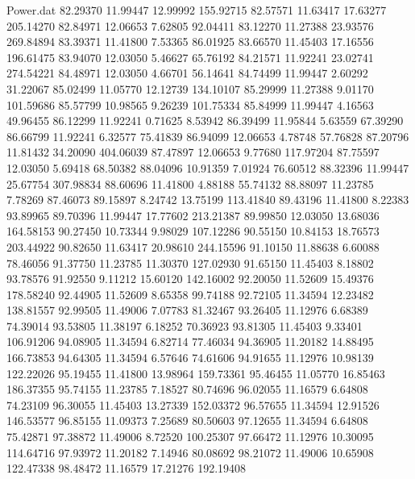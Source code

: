 \begin{filecontents}{Power.dat}
  82.29370   11.99447   12.99992  155.92715
  82.57571   11.63417   17.63277  205.14270
  82.84971   12.06653    7.62805   92.04411
  83.12270   11.27388   23.93576  269.84894
  83.39371   11.41800    7.53365   86.01925
  83.66570   11.45403   17.16556  196.61475
  83.94070   12.03050    5.46627   65.76192
  84.21571   11.92241   23.02741  274.54221
  84.48971   12.03050    4.66701   56.14641
  84.74499   11.99447    2.60292   31.22067
  85.02499   11.05770   12.12739  134.10107
  85.29999   11.27388    9.01170  101.59686
  85.57799   10.98565    9.26239  101.75334
  85.84999   11.99447    4.16563   49.96455
  86.12299   11.92241    0.71625    8.53942
  86.39499   11.95844    5.63559   67.39290
  86.66799   11.92241    6.32577   75.41839
  86.94099   12.06653    4.78748   57.76828
  87.20796   11.81432   34.20090  404.06039
  87.47897   12.06653    9.77680  117.97204
  87.75597   12.03050    5.69418   68.50382
  88.04096   10.91359    7.01924   76.60512
  88.32396   11.99447   25.67754  307.98834
  88.60696   11.41800    4.88188   55.74132
  88.88097   11.23785    7.78269   87.46073
  89.15897    8.24742   13.75199  113.41840
  89.43196   11.41800    8.22383   93.89965
  89.70396   11.99447   17.77602  213.21387
  89.99850   12.03050   13.68036  164.58153
  90.27450   10.73344    9.98029  107.12286
  90.55150   10.84153   18.76573  203.44922
  90.82650   11.63417   20.98610  244.15596
  91.10150   11.88638    6.60088   78.46056
  91.37750   11.23785   11.30370  127.02930
  91.65150   11.45403    8.18802   93.78576
  91.92550    9.11212   15.60120  142.16002
  92.20050   11.52609   15.49376  178.58240
  92.44905   11.52609    8.65358   99.74188
  92.72105   11.34594   12.23482  138.81557
  92.99505   11.49006    7.07783   81.32467
  93.26405   11.12976    6.68389   74.39014
  93.53805   11.38197    6.18252   70.36923
  93.81305   11.45403    9.33401  106.91206
  94.08905   11.34594    6.82714   77.46034
  94.36905   11.20182   14.88495  166.73853
  94.64305   11.34594    6.57646   74.61606
  94.91655   11.12976   10.98139  122.22026
  95.19455   11.41800   13.98964  159.73361
  95.46455   11.05770   16.85463  186.37355
  95.74155   11.23785    7.18527   80.74696
  96.02055   11.16579    6.64808   74.23109
  96.30055   11.45403   13.27339  152.03372
  96.57655   11.34594   12.91526  146.53577
  96.85155   11.09373    7.25689   80.50603
  97.12655   11.34594    6.64808   75.42871
  97.38872   11.49006    8.72520  100.25307
  97.66472   11.12976   10.30095  114.64716
  97.93972   11.20182    7.14946   80.08692
  98.21072   11.49006   10.65908  122.47338
  98.48472   11.16579   17.21276  192.19408

\end{filecontents}
